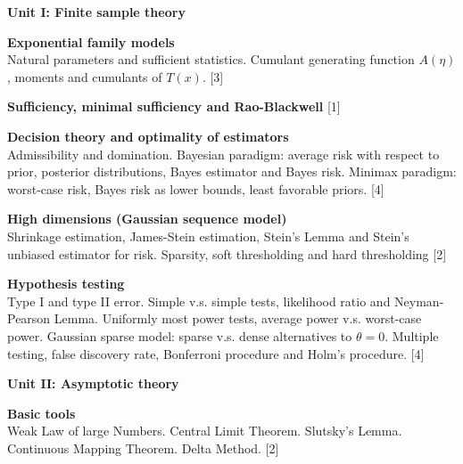 \documentclass[a4paper]{article}
\begin{document}
	\maketitle	

{	\noindent\textbf{Unit I: Finite sample theory}
	
	\vspace{10pt}
	\noindent\textbf{Exponential family models}\\
	Natural parameters and sufficient statistics. Cumulant generating function $A(\eta)$, moments and cumulants of $T(x)$.\hspace*{\fill} [3]
	
	\vspace{10pt}
	\noindent\textbf{Sufficiency, minimal sufficiency and Rao-Blackwell}\hspace*{\fill} [1]
	
	\vspace{10pt}
	\noindent\textbf{Decision theory and optimality of estimators}\\
	Admissibility and domination. Bayesian paradigm: average risk with respect to prior, posterior distributions, Bayes estimator and Bayes risk. Minimax paradigm: worst-case risk, Bayes risk as lower bounds, least favorable priors.\hspace*{\fill} [4]
	
	\vspace{10pt}
	\noindent\textbf{High dimensions (Gaussian sequence model)}\\
	Shrinkage estimation, James-Stein estimation, Stein's Lemma and Stein's unbiased estimator for risk. Sparsity, soft thresholding and hard thresholding\hspace*{\fill} [2]
	
	\vspace{10pt}
	\noindent\textbf{Hypothesis testing}\\
	Type I and type II error. Simple v.s. simple tests, likelihood ratio and Neyman-Pearson Lemma. Uniformly most power tests, average power v.s. worst-case power. Gaussian sparse model: sparse v.s. dense alternatives to $\theta = 0$. Multiple testing, false discovery rate, Bonferroni procedure and Holm's procedure.\hspace*{\fill} [4]
	
	\vspace{15pt}
	\noindent\textbf{Unit II: Asymptotic theory}
	
	\vspace{10pt}
	\noindent\textbf{Basic tools}\\
	Weak Law of large Numbers. Central Limit Theorem. Slutsky's Lemma. Continuous Mapping Theorem. Delta Method.\hspace*{\fill} [2]
	
}
\end{document}
